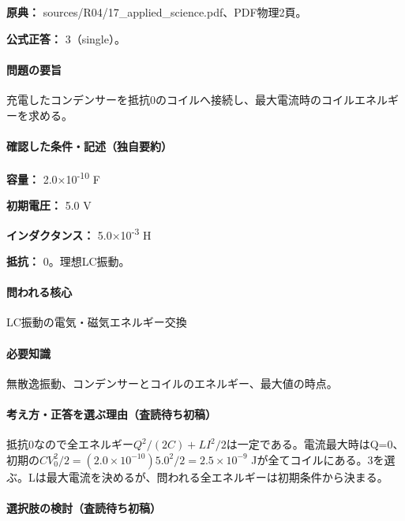 \noindent\textbf{原典：} sources/R04/17\_applied\_science.pdf、PDF物理2頁。

\textbf{公式正答：} 3（single）。

\paragraph{問題の要旨} 充電したコンデンサーを抵抗0のコイルへ接続し、最大電流時のコイルエネルギーを求める。

\paragraph{確認した条件・記述（独自要約）}\mbox{}\par

\noindent\textbf{容量：} 2.0×10\textsuperscript{-10} F\par

\noindent\textbf{初期電圧：} 5.0 V\par

\noindent\textbf{インダクタンス：} 5.0×10\textsuperscript{-3} H\par

\noindent\textbf{抵抗：} 0。理想LC振動。\par

\paragraph{問われる核心} LC振動の電気・磁気エネルギー交換

\paragraph{必要知識} 無散逸振動、コンデンサーとコイルのエネルギー、最大値の時点。

\paragraph{考え方・正答を選ぶ理由（査読待ち初稿）} 抵抗0なので全エネルギー\(Q^2/(2C)+LI^2/2\)は一定である。電流最大時はQ=\allowbreak{}0、初期の\(CV_0^2/2=(2.0\times10^{-10})5.0^2/2=2.5\times10^{-9}\) Jが全てコイルにある。3を選ぶ。Lは最大電流を決めるが、問われる全エネルギーは初期条件から決まる。

\paragraph{選択肢の検討（査読待ち初稿）}\mbox{}\par

